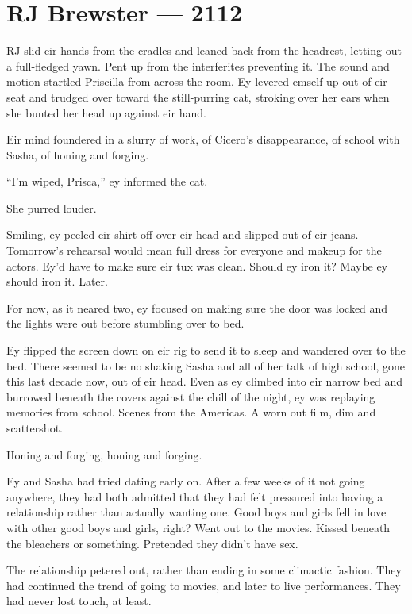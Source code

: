 \hypertarget{rj-brewster-2112}{%
\chapter*{RJ Brewster — 2112}\label{rj-brewster-2112}}

RJ slid eir hands from the cradles and leaned back from the headrest, letting out a full-fledged yawn. Pent up from the interferites preventing it. The sound and motion startled Priscilla from across the room. Ey levered emself up out of eir seat and trudged over toward the still-purring cat, stroking over her ears when she bunted her head up against eir hand.

Eir mind foundered in a slurry of work, of Cicero's disappearance, of school with Sasha, of honing and forging.

``I'm wiped, Prisca,'' ey informed the cat.

She purred louder.

Smiling, ey peeled eir shirt off over eir head and slipped out of eir jeans. Tomorrow's rehearsal would mean full dress for everyone and makeup for the actors. Ey'd have to make sure eir tux was clean. Should ey iron it? Maybe ey should iron it. Later.

For now, as it neared two, ey focused on making sure the door was locked and the lights were out before stumbling over to bed.

Ey flipped the screen down on eir rig to send it to sleep and wandered over to the bed. There seemed to be no shaking Sasha and all of her talk of high school, gone this last decade now, out of eir head. Even as ey climbed into eir narrow bed and burrowed beneath the covers against the chill of the night, ey was replaying memories from school. Scenes from the Americas. A worn out film, dim and scattershot.

Honing and forging, honing and forging.

Ey and Sasha had tried dating early on. After a few weeks of it not going anywhere, they had both admitted that they had felt pressured into having a relationship rather than actually wanting one. Good boys and girls fell in love with other good boys and girls, right? Went out to the movies. Kissed beneath the bleachers or something. Pretended they didn't have sex.

The relationship petered out, rather than ending in some climactic fashion. They had continued the trend of going to movies, and later to live performances. They had never lost touch, at least.

